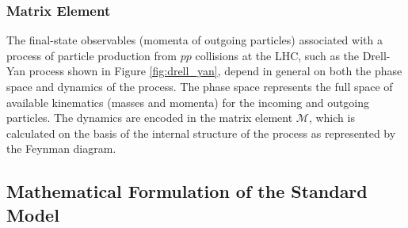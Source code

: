 \subsubsection{Matrix Element}


The final-state observables (momenta of outgoing particles) associated with a process of particle production from \(pp\) collisions at the LHC, such as the Drell-Yan process shown in Figure \ref{fig:drell_yan}, depend in general on both the phase space and dynamics of the process. The phase space represents the full space of available kinematics (masses and momenta) for the incoming and outgoing particles. The dynamics are encoded in the matrix element \(\mathcal{M}\), which is calculated on the basis of the internal structure of the process as represented by the Feynman diagram. 

%
%
%
%
%

\subsection{Mathematical Formulation of the Standard Model}
\label{sec:sm_math}

